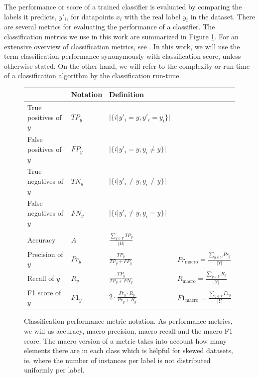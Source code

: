 The performance or score of a trained classifier is evaluated by comparing the labels it predicts, $y'_i$,  for datapoints $x_i$ with the real label $y_i$ in the dataset.
There are several metrics for evaluating the performance of a classifier.
The classification metrics we use in this work are summarized in Figure \ref{fig:classification_metrics}.
For an extensive overview of classification metrics, see \cite{Forman2003}.
In this work, we will use the term classification performance synonymously with classification score, unless otherwise stated.
On the other hand, we will refer to the complexity or run-time of a classification algorithm by the classification run-time.

\begin{figure}[htb!]
	\centering
	\renewcommand*{\arraystretch}{1.7}
	\begin{tabular}{llll}
		& Notation & Definition & \\
		\toprule
		True positives of $y$ &
		$TP_y$ &
		$\displaystyle |\{i | y'_i = y, y'_i = y_i \}|$ &
		\\
		False positives of $y$ &
		$FP_y$ &
		$\displaystyle |\{i | y'_i = y, y_i \neq y \}|$ &
		\\
		True negatives of $y$ &
		$TN_y$ &
		$\displaystyle |\{i | y'_i \neq y, y_i \neq y\}|$ &
		\\
		False negatives of $y$ &
		$FN_y$ &
		$\displaystyle |\{i | y'_i \neq y, y_i = y\}|$ &
		\\[1ex]
		\midrule{}%
		\\[-2ex]
		Accuracy &
		$A$ &
		$\displaystyle \frac{\sum\nolimits_{y \in Y} TP_y}{|D|}$ &
		\\[3ex]
		Precision of $y$ &
		$Pr_y$ &
		$\displaystyle \frac{TP_y}{TP_y + FP_y} $ &
		$Pr_{\text{macro}} = \displaystyle \frac{\sum\nolimits_{y \in Y} Pr_y}{|Y|}$
		\\[3ex]
		Recall of $y$ &
		$R_y$ &
		$\displaystyle \frac{TP_y}{TP_y + FN_y}$ &
		$R_{\text{macro}} = \displaystyle \frac{\sum\nolimits_{y \in Y} R_y}{|Y|}$
		\\[3ex]
		F1 score of $y$ &
		$F1_y$ &
		$\displaystyle 2 \cdot \frac{Pr_y \cdot R_y}{Pr_y + R_y}$ &
		$F1_{\text{macro}} = \displaystyle \frac{\sum\nolimits_{y \in Y} F1_y}{|Y|}$
		\\
	\end{tabular}
	\caption[Notation: Classification metrics]{Classification performance metric notation. As performance metrics, we will us accuracy, macro precision, macro recall and the macro F1 score. The macro version of a metric takes into account how many elements there are in each class which is helpful for skewed datasets, ie. where the number of instances per label is not distributed uniformly per label.}\label{fig:classification_metrics}
\end{figure}



